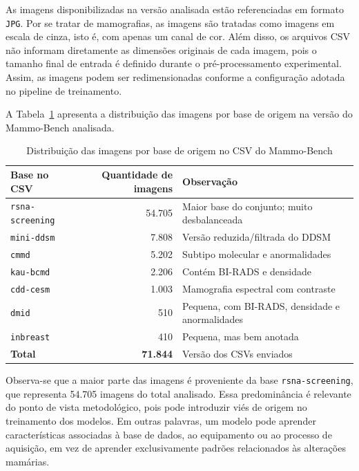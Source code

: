 \documentclass[
    12pt,
    openright,
    oneside,
    a4paper,
    english,
    brazil
]{abntex2}
\begin{document}
As imagens disponibilizadas na versão analisada estão referenciadas em formato \texttt{JPG}. Por se tratar de mamografias, as imagens são tratadas como imagens em escala de cinza, isto é, com apenas um canal de cor. Além disso, os arquivos CSV não informam diretamente as dimensões originais de cada imagem, pois o tamanho final de entrada é definido durante o pré-processamento experimental. Assim, as imagens podem ser redimensionadas conforme a configuração adotada no pipeline de treinamento.

A Tabela~\ref{tab:distribuicao_bases_mammobench} apresenta a distribuição das imagens por base de origem na versão do Mammo-Bench analisada.

\begin{table}[H]
\centering
\caption{Distribuição das imagens por base de origem no CSV do Mammo-Bench}
\label{tab:distribuicao_bases_mammobench}
\begin{tabular}{lrl}
\hline
\textbf{Base no CSV} & \textbf{Quantidade de imagens} & \textbf{Observação} \\ \hline
\texttt{rsna-screening} & 54.705 & Maior base do conjunto; muito desbalanceada \\
\texttt{mini-ddsm}      & 7.808  & Versão reduzida/filtrada do DDSM \\
\texttt{cmmd}           & 5.202  & Subtipo molecular e anormalidades \\
\texttt{kau-bcmd}       & 2.206  & Contém BI-RADS e densidade \\
\texttt{cdd-cesm}       & 1.003  & Mamografia espectral com contraste \\
\texttt{dmid}           & 510    & Pequena, com BI-RADS, densidade e anormalidades \\
\texttt{inbreast}       & 410    & Pequena, mas bem anotada \\ \hline
\textbf{Total}          & \textbf{71.844} & Versão dos CSVs enviados \\ \hline
\end{tabular}
\end{table}

Observa-se que a maior parte das imagens é proveniente da base \texttt{rsna-screening}, que representa 54.705 imagens do total analisado. Essa predominância é relevante do ponto de vista metodológico, pois pode introduzir viés de origem no treinamento dos modelos. Em outras palavras, um modelo pode aprender características associadas à base de dados, ao equipamento ou ao processo de aquisição, em vez de aprender exclusivamente padrões relacionados às alterações mamárias.
\end{document}
